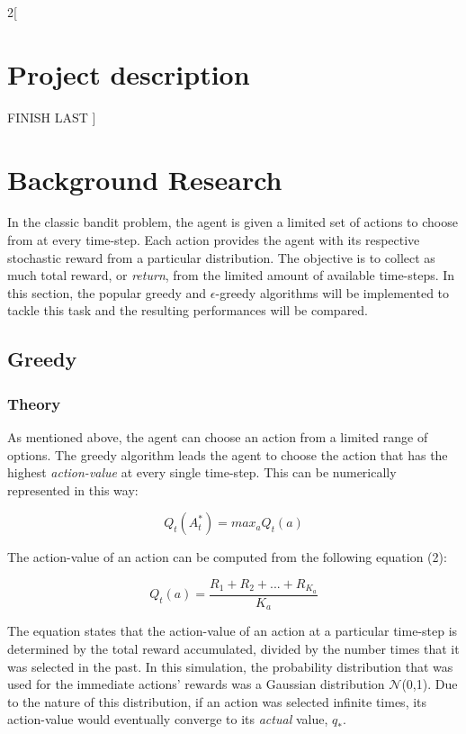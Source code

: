 \documentclass[a4paper]{article}
\begin{document}
	\begin{multicols}{2}[
		\section*{Project description}
		FINISH LAST
		]
		
		\section{Background Research}
		In the classic bandit problem, the agent is given a limited set of actions to choose from at every time-step. Each action provides the agent with its respective stochastic reward from a particular distribution. The objective is to collect as much total reward, or \textit{return}, from the limited amount of available time-steps. In this section, the popular greedy and $\epsilon$-greedy algorithms will be implemented to tackle this task and the resulting performances will be compared.

		\subsection{Greedy}
		\subsubsection{Theory}
		As mentioned above, the agent can choose an action from a limited range of options. The greedy algorithm leads the agent to choose the action that has the highest \textit{action-value} at every single time-step. This can be numerically represented in this way: 
		
		\begin{equation}
			Q_t(A_t^*) = max_a Q_t(a)
		\end{equation}
		
		The action-value of an action can be computed from the following equation (2):
		
		\begin{equation}
			Q_t(a) = \frac{R_1 + R_2 + ... + R_{K_a}}{K_a}
		\end{equation}

		The equation states that the action-value of an action at a particular time-step is determined by the total reward accumulated, divided by the number times that it was selected in the past. In this simulation, the probability distribution that was used for the immediate actions' rewards was a Gaussian distribution $\mathcal{N}$(0,1). Due to the nature of this distribution, if an action was selected infinite times, its action-value would eventually converge to its \textit{actual} value, $q_*$.
		

\end{multicols}
\end{document}

